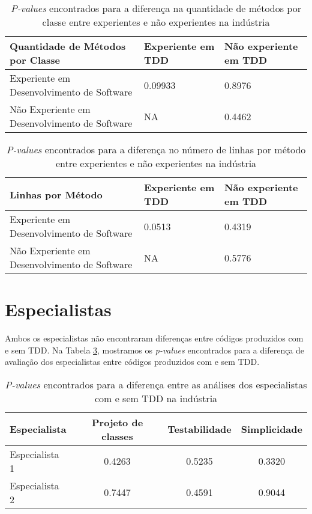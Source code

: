 \begin{table}[h!]
	\centering
	\begin{tabular}{ | p{5cm} | p{5cm} | p{5cm} | }
		\hline
		 Quantidade de Métodos por Classe & Experiente em TDD & Não experiente em TDD \\
		\hline
			Experiente em Desenvolvimento de Software 		& 0.09933	&	0.8976\\
			\hline
			Não Experiente em Desenvolvimento de Software 	& NA		&	0.4462\\
		\hline
	\end{tabular}
	\caption{\textit{P-values} encontrados para a diferença na quantidade de métodos por classe entre experientes e não experientes na indústria}
	\label{valores-exp-metodos-industria}
\end{table}

\begin{table}[h!]
	\centering
	\begin{tabular}{ | p{5cm} | p{5cm} | p{5cm} | }
		\hline
		 Linhas por Método & Experiente em TDD & Não experiente em TDD \\
		\hline
			Experiente em Desenvolvimento de Software 		& 0.0513	&	0.4319\\
			\hline
			Não Experiente em Desenvolvimento de Software 	& NA		&	0.5776\\
		\hline
	\end{tabular}
	\caption{\textit{P-values} encontrados para a diferença no número de linhas por método entre experientes e não experientes na indústria}
	\label{valores-exp-linhas-industria}
\end{table}

\newpage
\section{Especialistas}

Ambos os especialistas não encontraram diferenças entre códigos produzidos
com e sem TDD. Na Tabela
\ref{tab:especialistas-industria},
mostramos os \textit{p-values} encontrados para a diferença de avaliação dos especialistas
entre códigos produzidos com e sem TDD.


\begin{table}[h!]
	\centering
	\begin{tabular}{| p{5cm} | c | c | c | }
		\hline
		Especialista & Projeto de classes & Testabilidade & Simplicidade\\
		\hline
		Especialista 1 &	0.4263 &	0.5235 &	0.3320\\
		Especialista 2 &	0.7447 &	0.4591 &	0.9044\\
		\hline
	\end{tabular}
	\caption{\textit{P-values} encontrados para a diferença entre as análises dos especialistas com e sem TDD na indústria}
	\label{tab:especialistas-industria}
\end{table}

